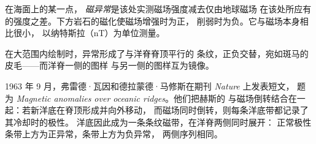 \begin{definition}[磁异常]\label{def:g11:drift-to-spreading:anomaly}
在海面上的某一点，
\emph{磁异常}是该处实测磁场强度减去仅由地球磁场
在该处所应有的强度之差。下方岩石的磁化使磁场增强时为正，
削弱时为负。它与磁场本身相比很小，
以纳特斯拉（\unit{nT}）为单位测量。
\end{definition}

在大范围内绘制时，异常形成了与洋脊脊顶平行的
条纹，正负交替，宛如斑马的皮毛——而洋脊一侧的图样
与另一侧的图样互为镜像。

\begin{history}[瓦因与马修斯，1963 年]
1963 年 9 月，弗雷德·瓦因和德拉蒙德·马修斯在期刊 \emph{Nature} 上发表短文，
题为 \emph{Magnetic anomalies over oceanic ridges}。他们把赫斯的
与磁场倒转结合在一起：若新洋底在脊顶形成并向外移动，
而磁场同时倒转，则每条洋底带都记录了其冷却时的极性。
洋底因此成为一条条纹磁带，在洋脊两侧同时展开：
正常极性条带上方为正异常，条带上方为负异常，
两侧序列相同。
\end{history}

